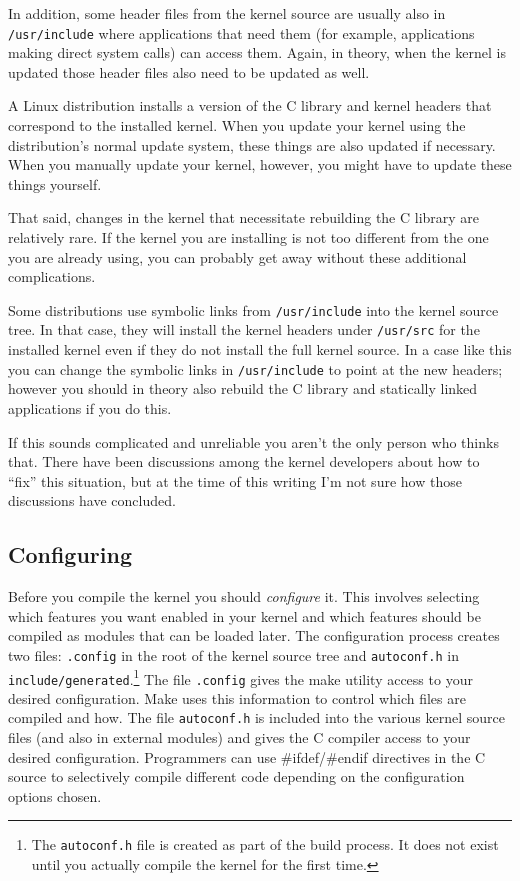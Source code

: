 \documentclass{article}
\newcommand{\filename}[1]{\texttt{#1}}
\newcommand{\newterm}[1]{\textit{#1}}
\begin{document}
In addition, some header files from the kernel source are usually also in
\filename{/usr/include} where applications that need them (for example, applications making
direct system calls) can access them. Again, in theory, when the kernel is updated those header
files also need to be updated as well.

A Linux distribution installs a version of the C library and kernel headers that correspond to
the installed kernel. When you update your kernel using the distribution's normal update system,
these things are also updated if necessary. When you manually update your kernel, however, you
might have to update these things yourself.

That said, changes in the kernel that necessitate rebuilding the C library are relatively rare.
If the kernel you are installing is not too different from the one you are already using, you
can probably get away without these additional complications.

Some distributions use symbolic links from \filename{/usr/include} into the kernel source tree.
In that case, they will install the kernel headers under \filename{/usr/src} for the installed
kernel even if they do not install the full kernel source. In a case like this you can change
the symbolic links in \filename{/usr/include} to point at the new headers; however you should in
theory also rebuild the C library and statically linked applications if you do this.

If this sounds complicated and unreliable you aren't the only person who thinks that. There have
been discussions among the kernel developers about how to ``fix'' this situation, but at the
time of this writing I'm not sure how those discussions have concluded.


\subsection{Configuring}
\label{sec:configuring}

Before you compile the kernel you should \newterm{configure} it. This involves selecting which
features you want enabled in your kernel and which features should be compiled as modules that
can be loaded later. The configuration process creates two files: \filename{.config} in the root
of the kernel source tree and \filename{autoconf.h} in
\filename{include/generated}.\footnote{The \filename{autoconf.h} file is created as part of the
build process. It does not exist until you actually compile the kernel for the first time.} The
file \filename{.config} gives the make utility access to your desired configuration. Make uses
this information to control which files are compiled and how. The file \filename{autoconf.h} is
included into the various kernel source files (and also in external modules) and gives the C
compiler access to your desired configuration. Programmers can use \#ifdef/\#endif directives in
the C source to selectively compile different code depending on the configuration options
chosen.
\end{document}
